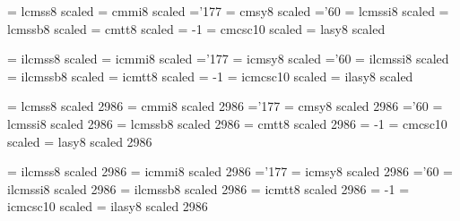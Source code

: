\font\twentyrm   = lcmss8  scaled  %
\font\twentyi    = cmmi8   scaled  %
    \skewchar\twentyi ='177                  %
\font\twentysy   = cmsy8   scaled  %
    \skewchar\twentysy ='60           %
\font\twentyit   = lcmssi8 scaled  %
\font\twentybf   = lcmssb8 scaled  %
\font\twentytt   = cmtt8   scaled  %
    \hyphenchar\twentytt = -1         %
\font\twentysc   = cmcsc10 scaled  %
\font\twentylasy = lasy8  scaled  %
 
\font\itwentyrm   = ilcmss8  scaled  %
\font\itwentyi    = icmmi8   scaled  %
    \skewchar\itwentyi ='177                  %
\font\itwentysy   = icmsy8   scaled  %
    \skewchar\itwentysy ='60           %
\font\itwentyit   = ilcmssi8 scaled  %
\font\itwentybf   = ilcmssb8 scaled  %
\font\itwentytt   = icmtt8   scaled  %
    \hyphenchar\itwentytt = -1         %
\font\itwentysc   = icmcsc10 scaled  %
\font\itwentylasy = ilasy8  scaled  %
 
\font\twentyfourrm   = lcmss8  scaled 2986 %
\font\twentyfouri    = cmmi8   scaled 2986 %
    \skewchar\twentyfouri ='177                  %
\font\twentyfoursy   = cmsy8   scaled 2986 %
    \skewchar\twentyfoursy ='60           %
\font\twentyfourit   = lcmssi8 scaled 2986 %
\font\twentyfourbf   = lcmssb8 scaled 2986 %
\font\twentyfourtt   = cmtt8   scaled 2986 %
    \hyphenchar\twentyfourtt = -1         %
\font\twentyfoursc   = cmcsc10 scaled  %
\font\twentyfourlasy = lasy8  scaled 2986 %
 
\font\itwentyfourrm   = ilcmss8  scaled 2986 %
\font\itwentyfouri    = icmmi8   scaled 2986 %
    \skewchar\itwentyfouri ='177                  %
\font\itwentyfoursy   = icmsy8   scaled 2986 %
    \skewchar\itwentyfoursy ='60           %
\font\itwentyfourit   = ilcmssi8 scaled 2986 %
\font\itwentyfourbf   = ilcmssb8 scaled 2986 %
\font\itwentyfourtt   = icmtt8   scaled 2986 %
    \hyphenchar\itwentyfourtt = -1         %
\font\itwentyfoursc   = icmcsc10 scaled  %
\font\itwentyfourlasy = ilasy8  scaled 2986 %
 
